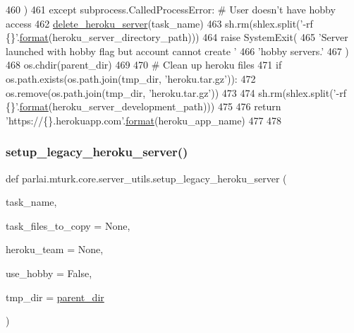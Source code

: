 \begin{DoxyCode}
460             )
461         \textcolor{keywordflow}{except} subprocess.CalledProcessError:  \textcolor{comment}{# User doesn't have hobby access}
462             \hyperlink{namespaceparlai_1_1mturk_1_1core_1_1server__utils_a8dfde882f9d6ff492ca565ae2334fc70}{delete\_heroku\_server}(task\_name)
463             sh.rm(shlex.split(\textcolor{stringliteral}{'-rf \{\}'}.\hyperlink{namespaceparlai_1_1chat__service_1_1services_1_1messenger_1_1shared__utils_a32e2e2022b824fbaf80c747160b52a76}{format}(heroku\_server\_directory\_path)))
464             \textcolor{keywordflow}{raise} SystemExit(
465                 \textcolor{stringliteral}{'Server launched with hobby flag but account cannot create '}
466                 \textcolor{stringliteral}{'hobby servers.'}
467             )
468     os.chdir(parent\_dir)
469 
470     \textcolor{comment}{# Clean up heroku files}
471     \textcolor{keywordflow}{if} os.path.exists(os.path.join(tmp\_dir, \textcolor{stringliteral}{'heroku.tar.gz'})):
472         os.remove(os.path.join(tmp\_dir, \textcolor{stringliteral}{'heroku.tar.gz'}))
473 
474     sh.rm(shlex.split(\textcolor{stringliteral}{'-rf \{\}'}.\hyperlink{namespaceparlai_1_1chat__service_1_1services_1_1messenger_1_1shared__utils_a32e2e2022b824fbaf80c747160b52a76}{format}(heroku\_server\_development\_path)))
475 
476     \textcolor{keywordflow}{return} \textcolor{stringliteral}{'https://\{\}.herokuapp.com'}.\hyperlink{namespaceparlai_1_1chat__service_1_1services_1_1messenger_1_1shared__utils_a32e2e2022b824fbaf80c747160b52a76}{format}(heroku\_app\_name)
477 
478 
\end{DoxyCode}
\mbox{\label{namespaceparlai_1_1mturk_1_1core_1_1server__utils_adff2f564896069e0b76ae1b007515a2b}} 
\subsubsection{\texorpdfstring{setup\+\_\+legacy\+\_\+heroku\+\_\+server()}{setup\_legacy\_heroku\_server()}}
{\footnotesize\ttfamily def parlai.\+mturk.\+core.\+server\+\_\+utils.\+setup\+\_\+legacy\+\_\+heroku\+\_\+server (\begin{DoxyParamCaption}\item[{}]{task\+\_\+name,  }\item[{}]{task\+\_\+files\+\_\+to\+\_\+copy = {\ttfamily None},  }\item[{}]{heroku\+\_\+team = {\ttfamily None},  }\item[{}]{use\+\_\+hobby = {\ttfamily False},  }\item[{}]{tmp\+\_\+dir = {\ttfamily \hyperlink{namespaceparlai_1_1mturk_1_1core_1_1server__utils_a193439bdbc25a32b00f1a43e6f8532d8}{parent\+\_\+dir}} }\end{DoxyParamCaption})}



